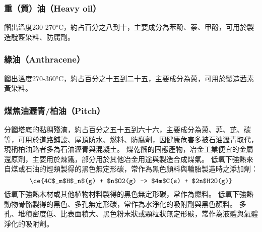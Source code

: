 \documentclass[a4paper,12pt]{report}
\begin{document}
\begin{itemize}
\subsubsection{重（質）油（Heavy oil）}
餾出溫度230-270°C，約占百分之八到十，主要成分為苯酚、萘、甲酚，可用於製造靛藍染料、防腐劑。
\subsubsection{綠油（Anthracene）}
餾出溫度270-360°C，約占百分之十五到二十五，主要成分為蒽，可用於製造茜素黃染料。
\subsubsection{煤焦油瀝青/柏油（Pitch）}
分餾塔底的黏稠殘渣，約占百分之五十五到六十六，主要成分為蒽、菲、芘、碳等，可用於道路鋪設、屋頂防水、燃料、防腐劑，因健康危害多被石油瀝青取代，現稱柏油路者多為石油瀝青與混凝土。
煤乾餾的固態產物，冶金工業便宜的金屬還原劑，主要用於煉鐵，部分用於其他冶金用途與製造合成煤氣。
低氧下強熱來自煤或石油的烴類製得的黑色無定形碳，常作為黑色顏料與輪胎製造時之添加劑：
\[\ce{4C$_m$H$_n$(g) + $n$O2(g) -> $4m$C(s) + $2n$H2O(g)}\]
低氧下強熱木材或其他植物材料製得的黑色無定形碳，常作為燃料。
低氧下強熱動物骨骼製得的黑色、多孔無定形碳，常作為水淨化的吸附劑與黑色顏料。
多孔、堆積密度低、比表面積大、黑色粉末狀或顆粒狀無定形碳，常作為液體與氣體淨化的吸附劑。



\end{itemize}
\end{document}
